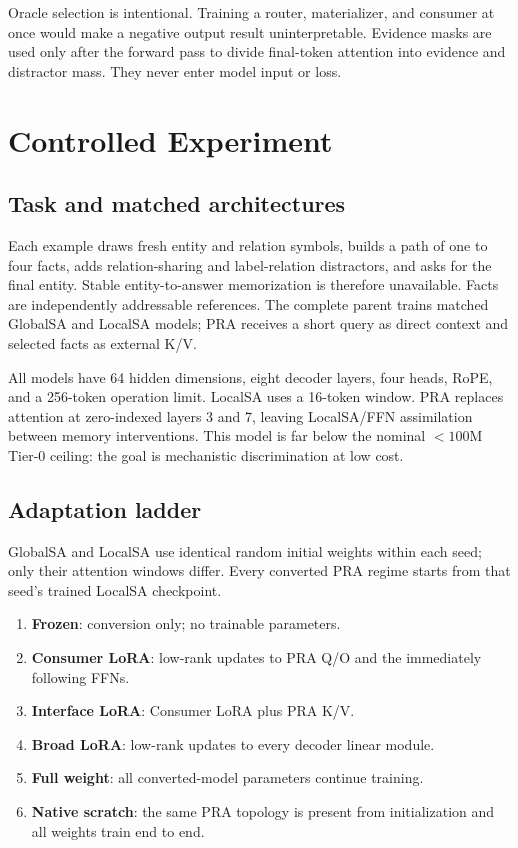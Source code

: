 \documentclass[11pt]{article}
\begin{document}
Oracle selection is intentional. Training a router, materializer, and consumer at
once would make a negative output result uninterpretable. Evidence masks are used
only after the forward pass to divide final-token attention into evidence and
distractor mass. They never enter model input or loss.

\section{Controlled Experiment}

\subsection{Task and matched architectures}

Each example draws fresh entity and relation symbols, builds a path of one to four
facts, adds relation-sharing and label-relation distractors, and asks for the final
entity. Stable entity-to-answer memorization is therefore unavailable. Facts are
independently addressable references. The complete parent trains matched GlobalSA
and LocalSA models; PRA receives a short query as direct context and selected facts
as external K/V.

All models have 64 hidden dimensions, eight decoder layers, four heads, RoPE, and
a 256-token operation limit. LocalSA uses a 16-token window. PRA replaces attention
at zero-indexed layers 3 and 7, leaving LocalSA/FFN assimilation between memory
interventions. This model is far below the nominal $<100$M Tier-0 ceiling: the goal
is mechanistic discrimination at low cost.

\subsection{Adaptation ladder}

GlobalSA and LocalSA use identical random initial weights within each seed; only
their attention windows differ. Every converted PRA regime starts from that
seed's trained LocalSA checkpoint.

\begin{enumerate}[leftmargin=*]
\item \textbf{Frozen}: conversion only; no trainable parameters.
\item \textbf{Consumer LoRA}: low-rank updates to PRA Q/O and the immediately
following FFNs.
\item \textbf{Interface LoRA}: Consumer LoRA plus PRA K/V.
\item \textbf{Broad LoRA}: low-rank updates to every decoder linear module.
\item \textbf{Full weight}: all converted-model parameters continue training.
\item \textbf{Native scratch}: the same PRA topology is present from
initialization and all weights train end to end.
\end{enumerate}
\end{document}
